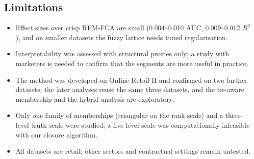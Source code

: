 \subsection{Limitations}

\begin{itemize}
\item Effect sizes over crisp RFM-FCA are small (0.004--0.010 AUC, 0.009--0.012 $R^2$), and on smaller datasets the fuzzy lattice needs tuned regularisation.
\item Interpretability was assessed with structural proxies only; a study with marketers is needed to confirm that the segments are more useful in practice.
\item The method was developed on Online Retail II and confirmed on two further datasets; the later analyses reuse the same three datasets, and the tie-aware membership and the hybrid analysis are exploratory.
\item Only one family of memberships (triangular on the rank scale) and a three-level truth scale were studied; a five-level scale was computationally infeasible with our closure algorithm.
\item All datasets are retail; other sectors and contractual settings remain untested.
\end{itemize}
